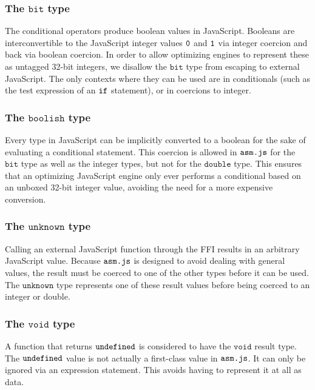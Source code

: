 \documentclass{article}
\newcommand{\mathjs}[1]{\mbox{\texttt{{#1}}}}
\newcommand{\bit}{\mathtt{bit}}
\newcommand{\double}{\mathtt{double}}
\newcommand{\unk}{\mathtt{unknown}}
\newcommand{\void}{\mathtt{void}}
\newcommand{\boolish}{\mathtt{boolish}}
\begin{document}
\subsubsection*{The $\bit$ type}

The conditional operators produce boolean values in
JavaScript. Booleans are interconvertible to the JavaScript integer
values $\mathjs{0}$ and $\mathjs{1}$ via integer coercion and back via
boolean coercion. In order to allow optimizing engines to represent
these as untagged 32-bit integers, we disallow the $\bit$ type from
escaping to external JavaScript. The only contexts where they can be
used are in conditionals (such as the test expression of an
$\mathjs{if}$ statement), or in coercions to integer.

\subsubsection*{The $\boolish$ type}

Every type in JavaScript can be implicitly converted to a boolean for
the sake of evaluating a conditional statement. This coercion is
allowed in $\mathjs{asm.js}$ for the $\bit$ type as well as the
integer types, but not for the $\double$ type. This ensures that an
optimizing JavaScript engine only ever performs a conditional based on
an unboxed 32-bit integer value, avoiding the need for a more
expensive conversion.

\subsubsection*{The $\unk$ type}

Calling an external JavaScript function through the FFI results in an
arbitrary JavaScript value. Because $\mathjs{asm.js}$ is designed to
avoid dealing with general values, the result must be coerced to one
of the other types before it can be used. The $\unk$ type represents
one of these result values before being coerced to an integer or
double.

\subsubsection*{The $\void$ type}

A function that returns $\mathjs{undefined}$ is considered to have the
$\void$ result type. The $\mathjs{undefined}$ value is not actually a
first-class value in $\mathjs{asm.js}$. It can only be ignored via an
expression statement. This avoids having to represent it at all as
data.
\end{document}
